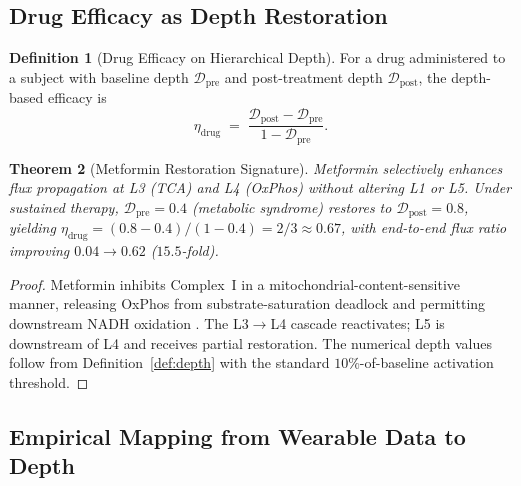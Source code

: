 \documentclass[11pt,twocolumn,a4paper]{article}
\newtheorem{theorem}{Theorem}[section]
\theoremstyle{definition}
\newtheorem{definition}[theorem]{Definition}
\theoremstyle{remark}
\newcommand{\Dhier}{\mathcal{D}}
\newcommand{\etadrug}{\eta_{\mathrm{drug}}}
\begin{document}
\subsection{Drug Efficacy as Depth Restoration}

\begin{definition}[Drug Efficacy on Hierarchical Depth]
\label{def:eta-drug}
For a drug administered to a subject with baseline depth
$\Dhier_{\mathrm{pre}}$ and post-treatment depth $\Dhier_{\mathrm{post}}$,
the depth-based efficacy is
\begin{equation}
\boxed{\;\;\etadrug \;=\; \frac{\Dhier_{\mathrm{post}} - \Dhier_{\mathrm{pre}}}{1 - \Dhier_{\mathrm{pre}}}.\;\;}
\label{eq:eta-drug}
\end{equation}
\end{definition}

\begin{theorem}[Metformin Restoration Signature]
\label{thm:metformin}
Metformin selectively enhances flux propagation at L3 (TCA) and L4
(OxPhos) without altering L1 or L5. Under sustained therapy,
$\Dhier_{\mathrm{pre}} = 0.4$ (metabolic syndrome) restores to
$\Dhier_{\mathrm{post}} = 0.8$, yielding $\etadrug = (0.8 - 0.4)/
(1 - 0.4) = 2/3 \approx 0.67$, with end-to-end flux ratio improving
$0.04 \to 0.62$ ($15.5$-fold).
\end{theorem}

\begin{proof}
Metformin inhibits Complex~I in a mitochondrial-content-sensitive
manner, releasing OxPhos from substrate-saturation deadlock and
permitting downstream NADH oxidation \citep{foretz2014, owen2000}.
The L3$\to$L4 cascade reactivates; L5 is downstream of L4 and
receives partial restoration. The numerical depth values follow
from Definition~\ref{def:depth} with the standard
$10\%$-of-baseline activation threshold.
\end{proof}

\subsection{Empirical Mapping from Wearable Data to Depth}
\end{document}
